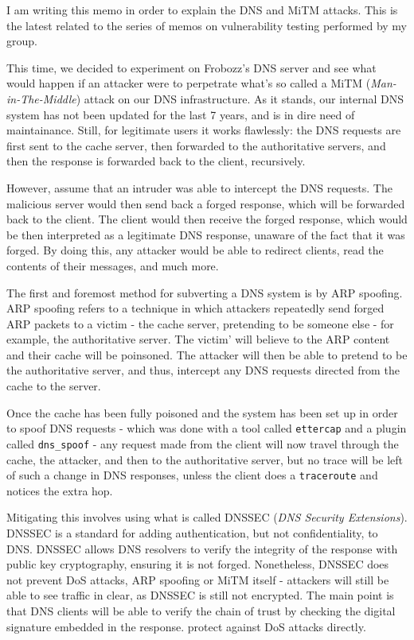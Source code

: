 \documentclass[paper=a4]{../../_global/texMemo}
\begin{document}
\maketitle

I am writing this memo in order to explain the DNS and MiTM attacks. This is the latest related to the series of memos on vulnerability testing performed by my group.

This time, we decided to experiment on Frobozz's DNS server and see what would happen if an attacker were to perpetrate what's so called a MiTM (\textit{Man-in-The-Middle}) attack on our DNS infrastructure. As it stands, our internal DNS system has not been updated for the last 7 years, and is in dire need of maintainance. Still, for legitimate users it works flawlessly: the DNS requests are first sent to the cache server, then forwarded to the authoritative servers, and then the response is forwarded back to the client, recursively. 

However, assume that an intruder was able to intercept the DNS requests. The malicious server would then send back a forged response, which will be forwarded back to the client. The client would then receive the forged response, which would be then interpreted as a legitimate DNS response, unaware of the fact that it was forged. By doing this, any attacker would be able to redirect clients, read the contents of their messages, and much more.

The first and foremost method for subverting a DNS system is by ARP spoofing. ARP spoofing refers to a technique in which attackers repeatedly send forged ARP packets to a victim - the cache server, pretending to be someone else - for example, the authoritative server. The victim' will believe to the ARP content and their cache will be poinsoned. The attacker will then be able to pretend to be the authoritative server, and thus, intercept any DNS requests directed from the cache to the server.

Once the cache has been fully poisoned and the system has been set up in order to spoof DNS requests - which was done with a tool called \verb=ettercap= and a plugin called \verb=dns_spoof= - any request made from the client will now travel through the cache, the attacker, and then to the authoritative server, but no trace will be left of such a change in DNS responses, unless the client does a \verb=traceroute= and notices the extra hop.

Mitigating this involves using what is called DNSSEC (\textit{DNS Security Extensions}). DNSSEC is a standard for adding authentication, but not confidentiality, to DNS. DNSSEC allows DNS resolvers to verify the integrity of the response with public key cryptography, ensuring it is not forged. Nonetheless, DNSSEC does not prevent DoS attacks, ARP spoofing or MiTM itself - attackers will still be able to see traffic in clear, as DNSSEC is still not encrypted. The main point is that DNS clients will be able to verify the chain of trust by checking the digital signature embedded in the response. protect against DoS attacks directly.
\end{document}
